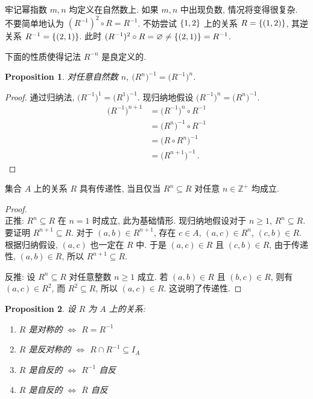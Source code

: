 \documentclass[UTF8]{ctexart}
\theoremstyle{mystyle}
\newtheorem{proposition}{Proposition}[section]
\theoremstyle{myremark}
\theoremstyle{plain}
\newcommand{\Z}{\mathbb Z}
\DeclarePairedDelimiter\set{\{}{\}}
\begin{document}
牢记幂指数 $ m, n $ 均定义在自然数上. 如果 $ m, n $ 中出现负数, 情况将变得很复杂. 不要简单地认为 $ (R^{-1})^2 \circ R = R^{-1} $. 不妨尝试 $ \set{1, 2} $ 上的关系 $ R = \set{(1, 2)} $, 其逆关系 $ R^{-1} = \set{(2, 1)} $. 此时 $ (R^{-1})^2 \circ R = \varnothing \neq \set{(2, 1)} = R^{-1} $.

下面的性质使得记法 $ R^{-n} $ 是良定义的.
\begin{proposition}
    对任意自然数 $ n $, $ \bigl( R^n \bigr)^{-1} = \bigl( R^{-1} \bigr)^n $.
\end{proposition}

\begin{proof}
    通过归纳法, $ \bigl( R^{-1} \bigr)^1 = \bigl( R^1 \bigr)^{-1} $. 现归纳地假设 $ \bigl( R^{-1} \bigr)^n = \bigl( R^n \bigr)^{-1} $.
    \begin{align*}
        \bigl( R^{-1} \bigr)^{n + 1} &= \bigl( R^{-1} \bigr)^n \circ R^{-1} \\
        &= \bigl( R^n \bigr)^{-1} \circ R^{-1} \\
        &= \bigl( R \circ R^n \bigr)^{-1} \\
        &= \bigl( R^{n + 1} \bigr)^{-1} \,.
    \end{align*}
\end{proof}

    


\begin{theorem} \label{transitivity}
    集合 $ A $ 上的关系 $ R $ 具有传递性, 当且仅当 $ R^n \subseteq R $ 对任意 $ n \in \Z^+ $ 均成立.
\end{theorem}

\begin{proof} \ \\
    正推: $ R^n \subseteq R $ 在 $ n = 1 $ 时成立, 此为基础情形. 现归纳地假设对于 $ n \geqslant 1 $, $ R^n \subseteq R $. 要证明 $ R^{n + 1} \subseteq R $. 对于 $ (a, b) \in R^{n + 1} $, 存在 $ c \in A $, $ (a, c) \in R^n $, $ (c, b) \in R $. 根据归纳假设, $ (a, c) $ 也一定在 $ R $ 中. 于是 $ (a, c) \in R $ 且 $ (c, b) \in R $, 由于传递性, $ (a, b) \in R $, 所以 $ R^{n + 1} \subseteq R $.
    
    反推: 设 $ R^n \subseteq R $ 对任意整数 $ n \geqslant 1 $ 成立. 若 $ (a, b) \in R $ 且 $ (b, c) \in R $, 则有 $ (a, c) \in R^2 $, 而 $ R^2 \subseteq R $, 所以 $ (a, c) \in R $. 这说明了传递性.
\end{proof}


\begin{proposition}
    设 $ R $ 为 $ A $ 上的关系:
    \begin{enumerate}
        \item $ R $ 是对称的 $ \iff $ $ R = R^{-1} $
        \item $ R $ 是反对称的 $ \iff $ $ R \cap R^{-1} \subseteq I_A $
        \item $ R $ 是自反的 $ \iff $ $ R^{-1} $ 自反
        \item $ R $ 是自反的 $ \iff $ $ \overline R $ 自反
    \end{enumerate}
\end{proposition}
\end{document}
